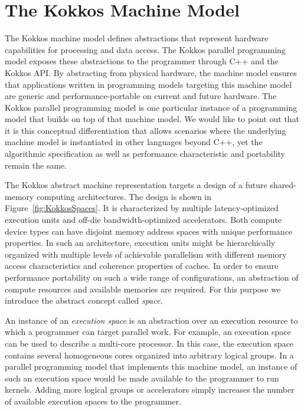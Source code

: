 \section{The Kokkos Machine Model}\label{chap:kokkosMM}

The Kokkos machine model defines abstractions that represent hardware capabilities for processing and data access. The Kokkos parallel programming model exposes these abstractions to the programmer through C++ and the Kokkos API. By abstracting from physical hardware, the machine model ensures that applications written in programming models targeting this machine model are generic and performance-portable on current and future hardware. The Kokkos parallel programming model is one particular instance of a programming model that builds on top of that machine model. We would like to point out that it is this conceptual differentiation that allows scenarios where the underlying machine model is instantiated in other languages beyond C++, yet the algorithmic specification as well as performance characteristic and portability remain the same. 

The Kokkos abstract machine representation targets a design of a future shared-memory computing architectures. The design is shown in Figure~\ref{fig:KokkosSpaces}. It is characterized by multiple latency-optimized execution units and off-die bandwidth-optimized accelerators. Both compute device types can have disjoint memory address spaces with unique performance properties. In such an architecture, execution units might be hierarchically organized with multiple levels of achievable parallelism with different memory access characteristics and coherence properties of caches. In order to ensure performance portability on such a wide range of configurations, an abstraction of compute resources and available memories are required. For this purpose we introduce the abstract concept called \emph{space}.

An instance of an \emph{execution space} is an abstraction over an execution resource to which a programmer can target parallel work. For example, an execution space can be used to describe a multi-core processor. In this case, the execution space contains several homogeneous cores organized into arbitrary logical groups. In a parallel programming model that implements this machine model, an instance of such an execution space would be made available to the programmer to run kernels. Adding more logical groups or accelerators simply increases the number of available execution spaces to the programmer.

